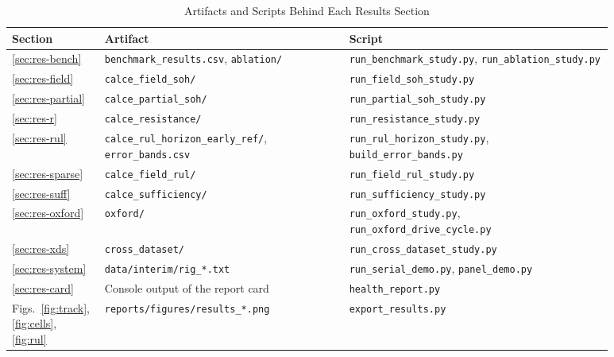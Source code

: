 \documentclass[12pt,a4paper]{amritareport}
\begin{document}
\setcounter{table}{0}
\begin{table}[htbp]
	\caption{Artifacts and Scripts Behind Each Results Section}
	\centering
	\footnotesize
	\renewcommand{\arraystretch}{1.15}
	\setlength{\tabcolsep}{3pt}
	\begin{tabular}{|L{0.09\linewidth}|L{0.38\linewidth}|L{0.41\linewidth}|}
		\hline
		\textbf{Section} & \textbf{Artifact} & \textbf{Script} \\
		\hline
		\ref{sec:res-bench} & \texttt{benchmark\_results.csv}, \texttt{ablation/} & \texttt{run\_benchmark\_study.py}, \texttt{run\_ablation\_study.py} \\
		\hline
		\ref{sec:res-field} & \texttt{calce\_field\_soh/} & \texttt{run\_field\_soh\_study.py} \\
		\hline
		\ref{sec:res-partial} & \texttt{calce\_partial\_soh/} & \texttt{run\_partial\_soh\_study.py} \\
		\hline
		\ref{sec:res-r} & \texttt{calce\_resistance/} & \texttt{run\_resistance\_study.py} \\
		\hline
		\ref{sec:res-rul} & \texttt{calce\_rul\_horizon\_}\allowbreak\texttt{early\_ref/}, \texttt{error\_bands.csv} & \texttt{run\_rul\_horizon\_study.py}, \texttt{build\_error\_bands.py} \\
		\hline
		\ref{sec:res-sparse} & \texttt{calce\_field\_rul/} & \texttt{run\_field\_rul\_study.py} \\
		\hline
		\ref{sec:res-suff} & \texttt{calce\_sufficiency/} & \texttt{run\_sufficiency\_study.py} \\
		\hline
		\ref{sec:res-oxford} & \texttt{oxford/} & \texttt{run\_oxford\_study.py}, \texttt{run\_oxford\_drive\_cycle.py} \\
		\hline
		\ref{sec:res-xds} & \texttt{cross\_dataset/} & \texttt{run\_cross\_dataset\_study.py} \\
		\hline
		\ref{sec:res-system} & \texttt{data/interim/rig\_*.txt} & \texttt{run\_serial\_demo.py}, \texttt{panel\_demo.py} \\
		\hline
		\ref{sec:res-card} & Console output of the report card & \texttt{health\_report.py} \\
		\hline
		Figs.~\ref{fig:track}, \ref{fig:cells}, \ref{fig:rul} & \texttt{reports/figures/}\allowbreak\texttt{results\_*.png} & \texttt{export\_results.py} \\
		\hline
	\end{tabular}
	\label{tab:provenance}
\end{table}
\end{document}
